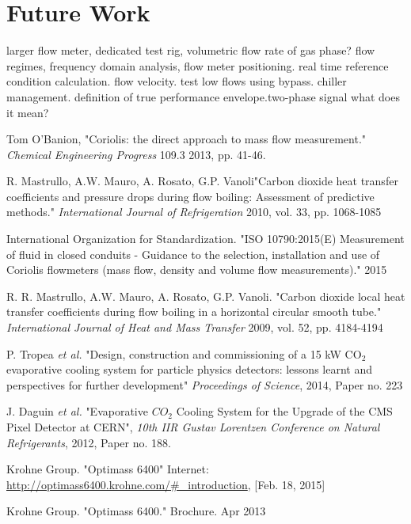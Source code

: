 \documentclass{report}
\begin{document}
\chapter{Future Work}\label{future work}
larger flow meter, dedicated test rig, volumetric flow rate of gas phase? flow regimes, frequency domain analysis, flow meter positioning. real time reference condition calculation. flow velocity. test low flows using bypass. chiller management. definition of true performance envelope.two-phase signal what does it mean?

\begin{thebibliography}{9}
Tom O'Banion,  "Coriolis: the direct approach to mass flow measurement." \textit{Chemical Engineering Progress} 109.3 2013, pp. 41-46.

R. Mastrullo, A.W. Mauro, A. Rosato, G.P. Vanoli"Carbon dioxide heat transfer coefficients and pressure drops during flow boiling: Assessment of predictive methods." \textit{International Journal of Refrigeration} 2010, vol. 33, pp. 1068-1085

International Organization for Standardization. "ISO 10790:2015(E) Measurement of fluid in closed conduits - Guidance to the selection, installation and use of Coriolis flowmeters (mass flow, density and volume flow measurements)." 2015

R. R. Mastrullo, A.W. Mauro, A. Rosato, G.P. Vanoli. "Carbon dioxide local heat transfer coefficients during flow boiling in a horizontal circular smooth tube." \textit{International Journal of Heat and Mass Transfer} 2009, vol. 52, pp. 4184-4194

P. Tropea \textit{et al.} "Design, construction and commissioning of a 15 kW CO$_2$ evaporative cooling system for particle physics detectors: lessons learnt and perspectives for further development" \textit{Proceedings of Science}, 2014, Paper no. 223

J. Daguin \textit{et al.} "Evaporative $CO_2$ Cooling System for the Upgrade of the CMS Pixel Detector at CERN", \textit{10th IIR Gustav Lorentzen Conference on Natural Refrigerants}, 2012, Paper no. 188.

Krohne Group. "Optimass 6400" Internet: \underline{http://optimass6400.krohne.com/\#\_introduction}, [Feb. 18, 2015]

Krohne Group. "Optimass 6400." Brochure. Apr 2013


\end{thebibliography}
\end{document}

